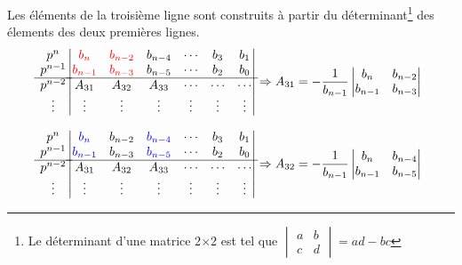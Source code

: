 Les éléments de la troisième ligne sont construits à partir du 
déterminant\footnote{Le déterminant d'une matrice 2$\times$2 est tel que 
$\begin{vmatrix} a & b \\ c & d \end{vmatrix}=ad-bc$} des élements des deux premières lignes.
\[
\begin{matrix}
    p^n    \\
    p^{n-1}\\
    \hline
    p^{n-2}\\
    \vdots \\
\end{matrix}
\begin{vmatrix}
    \textcolor{red}{b_n}       & \textcolor{red}{b_{n-2}}    & b_{n-4}    & \cdots & b_3            & b_1         \\
    \textcolor{red}{b_{n-1}}   & \textcolor{red}{b_{n-3}}    & b_{n-5}    & \cdots & b_2            & b_0         \\
    \hline
    A_{31}  & A_{32}     & A_{33}     & \cdots & \cdots         & \cdots      \\
    \vdots    & \vdots     & \vdots     & \vdots & \vdots         & \vdots      \\
\end{vmatrix}
\Rightarrow
A_{31}=-\dfrac{1}{b_{n-1}}\begin{vmatrix} b_{n}  & b_{n-2} \\ b_{n-1} & b_{n-3}\end{vmatrix}
\]

\[
\begin{matrix}
    p^n    \\
    p^{n-1}\\
    \hline
    p^{n-2}\\
    \vdots \\
\end{matrix}
\begin{vmatrix}
    \textcolor{blue}{b_n}       & b_{n-2}    & \textcolor{blue}{b_{n-4}}    & \cdots & b_3            & b_1         \\
    \textcolor{blue}{b_{n-1}}   & b_{n-3}    & \textcolor{blue}{b_{n-5}}    & \cdots & b_2            & b_0         \\
    \hline
    A_{31}    & A_{32}     & A_{33}     & \cdots & \cdots         & \cdots      \\
    \vdots    & \vdots     & \vdots     & \vdots & \vdots         & \vdots      \\
\end{vmatrix}
\Rightarrow
A_{32}=-\dfrac{1}{b_{n-1}}\begin{vmatrix} b_{n}  & b_{n-4} \\ b_{n-1} & b_{n-5}\end{vmatrix}
\]

